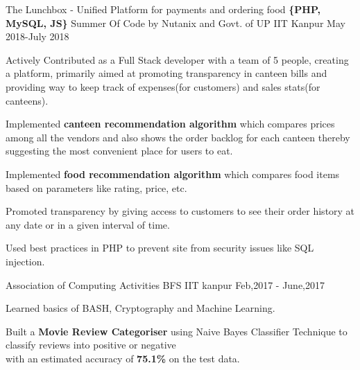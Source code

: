 
\begin{cventries}

  \cventry
  {The Lunchbox - Unified Platform for payments and ordering food \textbf{\{PHP, MySQL, JS\}}}
  {Summer Of Code by Nutanix and Govt. of UP}
  {IIT Kanpur}
  {May 2018-July 2018}
  {
    \begin{cvitems}
     \item Actively Contributed as a Full Stack developer with a team of 5 people, creating a platform, primarily aimed at promoting transparency in canteen bills and providing way to keep track of expenses(for customers) and sales stats(for canteens). 
     \item Implemented \textbf{canteen recommendation algorithm} which compares prices among all the vendors and also shows the order backlog for each canteen thereby suggesting the most convenient place for users to eat. 
     \item Implemented \textbf{food recommendation algorithm} which compares food items based on parameters like rating, price, etc.
     \item Promoted transparency by giving access to customers to see their order history at any date or in a given interval of time. 
     \item Used best practices in PHP to prevent site from security issues like SQL injection. 
    \end{cvitems}
  }

  \cventry
  {Association of Computing Activities}
  {BFS}
  {IIT kanpur}
  {Feb,2017 - June,2017}
  {
     \begin{cvitems}
      \item Learned basics of BASH, Cryptography and Machine Learning.
      \item Built a \textbf{Movie Review Categoriser} using Naive Bayes Classifier Technique
            to classify reviews into positive or negative\\ with an estimated accuracy of \textbf{75.1\%} on the test data.
     \end{cvitems}
  }



\end{cventries}
